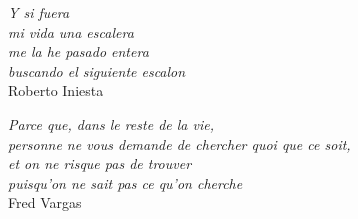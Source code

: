 \thispagestyle{empty}

\vspace*{\fill}
\begin{flushleft}
\textit{Y si fuera \\
mi vida una escalera \\
me la he pasado entera \\
buscando el siguiente escalon} \\
\vspace{0.05in}
Roberto Iniesta
\end{flushleft}

\vspace*{\fill}
\begin{flushright}
\textit{Parce que, dans le reste de la vie, \\
personne ne vous demande de chercher quoi que ce soit,\\
et on ne risque pas de trouver\\
puisqu'on ne sait pas ce qu'on cherche} \\
\vspace{0.05in}
Fred Vargas
\end{flushright}
\vspace*{\fill}



\vspace{5in}

